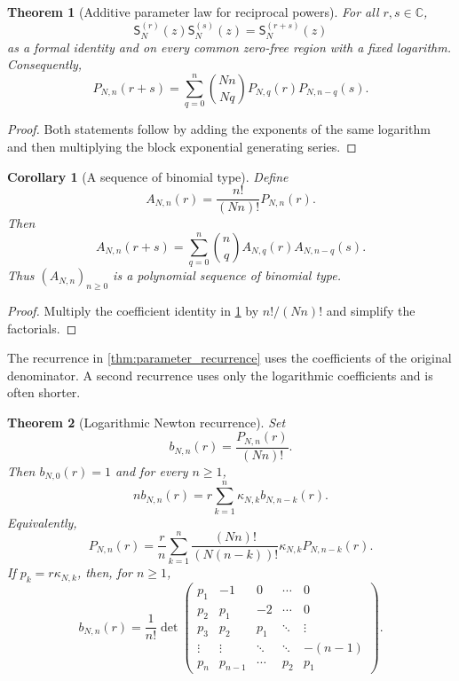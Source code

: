 \documentclass[11pt]{article}
\newtheorem{theorem}{Theorem}[section]
\newtheorem{corollary}[corollary]{Corollary}
\theoremstyle{definition}
\theoremstyle{remark}
\newcommand{\CC}{\mathbb C}
\newcommand{\Sfun}{\mathsf S}
\begin{document}
\begin{theorem}[Additive parameter law for reciprocal powers]\label{thm:reciprocal_parameter_addition}
For all $r,s\in\CC$,
\[
\Sfun_N^{(r)}(z)\Sfun_N^{(s)}(z)
=
\Sfun_N^{(r+s)}(z)
\]
as a formal identity and on every common zero-free region with a fixed logarithm.  Consequently,
\[
P_{N,n}(r+s)
=
\sum_{q=0}^{n}
\binom{Nn}{Nq}
P_{N,q}(r)P_{N,n-q}(s).
\]
\end{theorem}

\begin{proof}
Both statements follow by adding the exponents of the same logarithm and then multiplying the block exponential generating series.
\end{proof}

\begin{corollary}[A sequence of binomial type]\label{cor:binomial_type}
Define
\[
A_{N,n}(r)
=
\frac{n!}{(Nn)!}P_{N,n}(r).
\]
Then
\[
A_{N,n}(r+s)
=
\sum_{q=0}^{n}
\binom nq
A_{N,q}(r)A_{N,n-q}(s).
\]
Thus $(A_{N,n})_{n\geq0}$ is a polynomial sequence of binomial type.
\end{corollary}

\begin{proof}
Multiply the coefficient identity in \cref{thm:reciprocal_parameter_addition} by $n!/(Nn)!$ and simplify the factorials.
\end{proof}


The recurrence in \cref{thm:parameter_recurrence} uses the coefficients of the original denominator.  A second recurrence uses only the logarithmic coefficients and is often shorter.

\begin{theorem}[Logarithmic Newton recurrence]\label{thm:logarithmic_newton_recurrence}
Set
\[
b_{N,n}(r)=\frac{P_{N,n}(r)}{(Nn)!}.
\]
Then $b_{N,0}(r)=1$ and
for every $n\geq1$,
\[
nb_{N,n}(r)
=
r\sum_{k=1}^{n}\kappa_{N,k}b_{N,n-k}(r).
\]
Equivalently,
\[
P_{N,n}(r)
=
\frac r n
\sum_{k=1}^{n}
\frac{(Nn)!}{(N(n-k))!}
\kappa_{N,k}P_{N,n-k}(r).
\]
If $p_k=r\kappa_{N,k}$, then, for $n\geq1$,
\[
b_{N,n}(r)
=
\frac1{n!}
\det
\begin{pmatrix}
p_1&-1&0&\cdots&0\\
p_2&p_1&-2&\cdots&0\\
p_3&p_2&p_1&\ddots&\vdots\\
\vdots&\vdots&\ddots&\ddots&-(n-1)\\
p_n&p_{n-1}&\cdots&p_2&p_1
\end{pmatrix}.
\]
\end{theorem}
\end{document}
